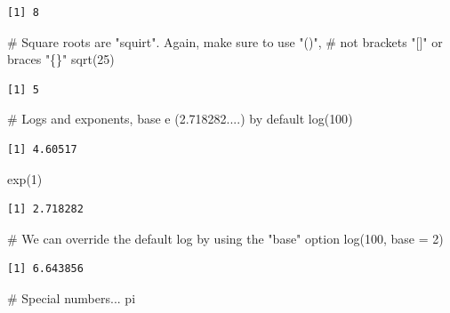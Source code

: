 \documentclass[
  letterpaper,
  DIV=11,
  numbers=noendperiod]{scrreprt}
\newenvironment{Shaded}{\begin{snugshade}}{\end{snugshade}}
\newcommand{\AttributeTok}[1]{\textcolor[rgb]{0.40,0.45,0.13}{#1}}
\newcommand{\CommentTok}[1]{\textcolor[rgb]{0.37,0.37,0.37}{#1}}
\newcommand{\DecValTok}[1]{\textcolor[rgb]{0.68,0.00,0.00}{#1}}
\newcommand{\FunctionTok}[1]{\textcolor[rgb]{0.28,0.35,0.67}{#1}}
\newcommand{\NormalTok}[1]{\textcolor[rgb]{0.00,0.23,0.31}{#1}}
\begin{document}
\begin{verbatim}
[1] 8
\end{verbatim}

\begin{Shaded}
\begin{Highlighting}[]
\CommentTok{\# Square roots are "squirt". Again, make sure to use "()", }
\CommentTok{\# not brackets "[]" or braces "\{\}"}
\FunctionTok{sqrt}\NormalTok{(}\DecValTok{25}\NormalTok{)}
\end{Highlighting}
\end{Shaded}

\begin{verbatim}
[1] 5
\end{verbatim}

\begin{Shaded}
\begin{Highlighting}[]
\CommentTok{\# Logs and exponents, base e (2.718282....) by default }
\FunctionTok{log}\NormalTok{(}\DecValTok{100}\NormalTok{)}
\end{Highlighting}
\end{Shaded}

\begin{verbatim}
[1] 4.60517
\end{verbatim}

\begin{Shaded}
\begin{Highlighting}[]
\FunctionTok{exp}\NormalTok{(}\DecValTok{1}\NormalTok{)}
\end{Highlighting}
\end{Shaded}

\begin{verbatim}
[1] 2.718282
\end{verbatim}

\begin{Shaded}
\begin{Highlighting}[]
\CommentTok{\# We can override the default log by using the "base" option}
\FunctionTok{log}\NormalTok{(}\DecValTok{100}\NormalTok{, }\AttributeTok{base =} \DecValTok{2}\NormalTok{)}
\end{Highlighting}
\end{Shaded}

\begin{verbatim}
[1] 6.643856
\end{verbatim}

\begin{Shaded}
\begin{Highlighting}[]
\CommentTok{\# Special numbers...}
\NormalTok{pi }
\end{Highlighting}
\end{Shaded}
\end{document}
